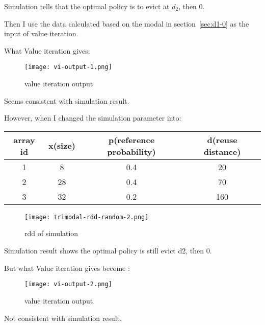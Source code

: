 Simulation tells that the optimal policy is to evict at $d_2$, then 0.

Then I use the data calculated based on the modal in section~\ref{sec:d1-0} as
the input of value iteration. 

What Value iteration gives:
\begin{figure}[H]
\centering
\texttt{[image: vi-output-1.png]}
\caption{value iteration output}
\end{figure}

Seems consistent with simulation result.

However, when I changed the simulation parameter into:

\begin{center}
\begin{tabular}{ c | c c c}
\hline
array id & x(size) & p(reference probability) & d(reuse distance) \\
\hline
1 & 8 & 0.4 & 20 \\
2 & 28 & 0.4 & 70 \\
3 & 32 & 0.2 & 160 \\
\hline
\end{tabular}

\begin{figure}[H]
\centering
\texttt{[image: trimodal-rdd-random-2.png]}
\caption{rdd of simulation}
\end{figure}
\end{center}

Simulation result shows the optimal policy is still evict d2, then 0.

But what Value iteration gives become :
\begin{figure}[H]
\centering
\texttt{[image: vi-output-2.png]}
\caption{value iteration output}
\end{figure}

Not consistent with simulation result.
